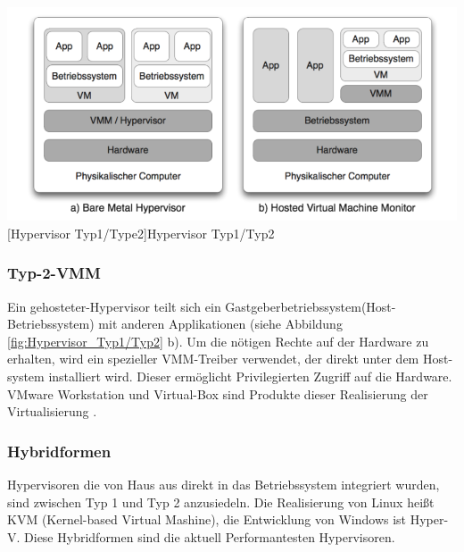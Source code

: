 \vspace{1em}
\begin{minipage}{\linewidth}
	\centering
	\includegraphics[width=1\linewidth]{pics/Hypervisoren.PNG}
	[Hypervisor Typ1/Type2]{Hypervisor Typ1/Typ2 \cite{Meinel2011VirtualisierungMarktubersicht} }
	\label{fig:Hypervisor_Typ1/Typ2}
\end{minipage}

\subsubsection{Typ-2-VMM}
Ein gehosteter-Hypervisor teilt sich ein Gastgeberbetriebssystem(Host-Betriebssystem) mit anderen Applikationen (siehe Abbildung \ref{fig:Hypervisor_Typ1/Typ2} b). Um die nötigen Rechte auf der Hardware zu erhalten, wird ein spezieller VMM-Treiber verwendet, der direkt unter dem Host-system installiert wird. Dieser ermöglicht Privilegierten Zugriff auf die Hardware. VMware Workstation und Virtual-Box sind Produkte dieser Realisierung der Virtualisierung \cite{Glatz2015Betriebssysteme}.

\subsubsection{Hybridformen}
Hypervisoren die von Haus aus direkt in das Betriebssystem integriert wurden, sind zwischen Typ 1 und Typ 2 anzusiedeln. Die Realisierung von Linux heißt KVM (Kernel-based Virtual Mashine), die Entwicklung von Windows ist Hyper-V. Diese Hybridformen sind die aktuell Performantesten Hypervisoren. 

